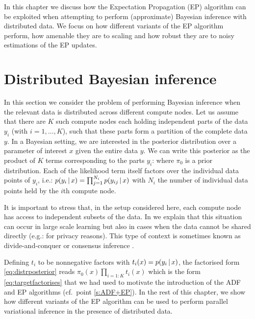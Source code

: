 
In this chapter we discuss how the Expectation Propagation (EP) algorithm can be exploited when attempting to perform (approximate) Bayesian inference with distributed data. 
We focus on how different variants of the EP algorithm perform, how amenable they are to scaling and how robust they are to noisy estimations of the EP updates. 

\section{Distributed Bayesian inference}

In this section we consider the problem of performing Bayesian inference when the relevant data is distributed across different compute nodes. 
Let us assume that there are $K$ such compute nodes each holding independent parts of the data $y_i$ (with $i=1,\dots,K$), such that these parts form a partition of the complete data $y$. 
In a Bayesian setting, we are interested in the posterior distribution over a parameter of interest $x$ given the entire data $y$. We can write this posterior as the product of $K$ terms corresponding to the parts $y_i$: 
%
%
where $\pi_0$ is a prior distribution. Each of the likelihood term itself factors over the individual data points of $y_i$, i.e.: $p(y_i\,|\, x)=\prod_{j=1}^{N_i}p(y_{ij}\,|\, x)$ with $N_i$ the number of individual data points held by the $i$th compute node.

It is important to stress that, in the setup considered here, each compute node has access to independent subsets of the data. In \citet{hasenclever16} we explain that this situation can occur in large scale learning but also in cases when the data cannot be shared directly (e.g.: for privacy reasons). This type of context is sometimes known as divide-and-conquer or consensus inference \citep{kleiner14,battey15,zhao16}. 

Defining $t_i$ to be nonnegative factors with $t_i(x)=p(y_i\,|\, x)$, the factorised form \eqref{eq:distrposterior} reads $\pi_0(x)\prod_{i=1:K}t_i(x)$ which is the form \eqref{eq:targetfactorises} that we had used to motivate the introduction of the ADF and EP algorithms (cf.\ point \ref{s:ADF+EP}).
In the rest of this chapter, we show how different variants of the EP algorithm can be used to perform parallel variational inference in the presence of distributed data. 

